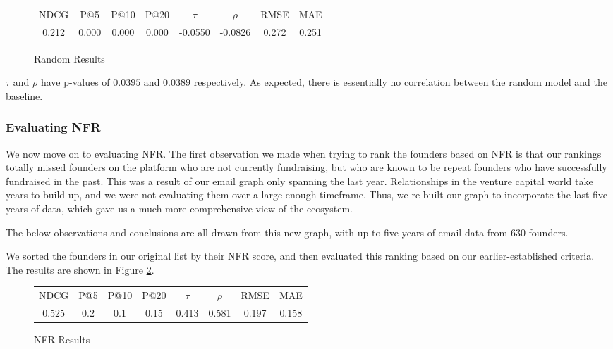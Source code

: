 \begin{figure}[ht]
\begin{tabular}{c | c | c | c | c | c | c | c}
NDCG & P@5 & P@10 & P@20 & $\tau$ & $\rho$ & RMSE & MAE  \\
0.212 & 0.000 & 0.000 & 0.000 & -0.0550 & -0.0826 & 0.272 & 0.251 \\
\end{tabular}
\centering
\caption{Random Results}
\label{fig:rand:results}
\end{figure}

$\tau$ and $\rho$ have p-values of $0.0395$ and $0.0389$ respectively. As expected, there is essentially no correlation between the random model and the baseline.

\subsubsection{Evaluating NFR}
\label{ch5:nfr:eval}

We now move on to evaluating NFR. The first observation we made when trying to rank the founders based on NFR is that our rankings totally missed founders on the platform who are not currently fundraising, but who are known to be repeat founders who have successfully fundraised in the past. This was a result of our email graph only spanning the last year. Relationships in the venture capital world take years to build up, and we were not evaluating them over a large enough timeframe. Thus, we re-built our graph to incorporate the last five years of data, which gave us a much more comprehensive view of the ecosystem.

The below observations and conclusions are all drawn from this new graph, with up to five years of email data from $630$ founders.

We sorted the founders in our original list by their NFR score, and then evaluated this ranking based on our earlier-established criteria. The results are shown in Figure \ref{fig:nfr:results}.

\begin{figure}[ht]
\begin{tabular}{c | c | c | c | c | c | c | c}
NDCG & P@5 & P@10 & P@20 & $\tau$ & $\rho$ & RMSE & MAE  \\
0.525 & 0.2 & 0.1 & 0.15 & 0.413 & 0.581 & 0.197 & 0.158 \\
\end{tabular}
\centering
\caption{NFR Results}
\label{fig:nfr:results}
\end{figure}

